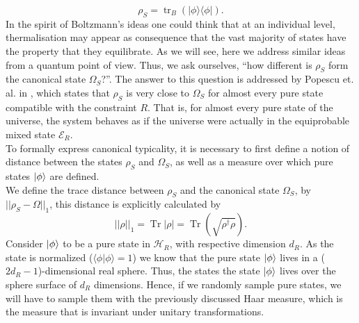 \begin{equation}
\rho_{S}=\operatorname{tr}_{B}(|\phi\rangle\langle\phi|).
\label{CH1:Reduced_density_random_pure_state}
\end{equation}
In the spirit of Boltzmann's ideas one could think that at an individual level, thermalisation may appear as consequence that the vast majority of states have the property that they equilibrate. As we will see, here we address similar ideas from a quantum point of view. Thus, we ask ourselves, ``how different is $\rho_S$ form the canonical state $\Omega_S$?''. The answer to this question is addressed by Popescu et. al. in \cite{popescu_entanglement_2006,popescu_foundations_2005}, which states that $\rho_S$ is very close to $\Omega_S$ for almost every pure state compatible with the constraint $R$. That is, for almost every pure state of the universe, the system behaves as if the universe were actually in the equiprobable mixed state $\mathcal{E}_R$. \\
\indent To formally express canonical typicality, it is necessary to first define a notion of distance between the states $\rho_S$ and $\Omega_S$, as well as a measure over which pure states $\mathinner{|{\phi}\rangle}$ are defined.\\
\indent We define the trace distance between $\rho_S$ and the canonical state $\Omega_S$, by  $||\rho_S-\Omega||_1$, this distance is explicitly calculated by
\begin{equation}
||\rho||_1=\operatorname{Tr}|\rho|=\operatorname{Tr}\left(\sqrt{\rho^{\dagger} \rho}\right).
\label{CH1:Trace_distance}
\end{equation}
Consider $\mathinner{|{\phi}\rangle}$ to be a pure state in $\mathcal{H}_R$, with respective dimension $d_R$. As the state is normalized ($\langle\phi | \phi\rangle=1$) we know that the pure state $\mathinner{|{\phi}\rangle}$ lives in a ($2d_R-1$)-dimensional real sphere. Thus, the states the state $\mathinner{|{\phi}\rangle}$ lives over the sphere surface of $d_R$ dimensions. Hence, if we randomly sample pure states, we will have to sample them with the previously discussed Haar measure, which is the measure that is invariant under unitary transformations.\\
